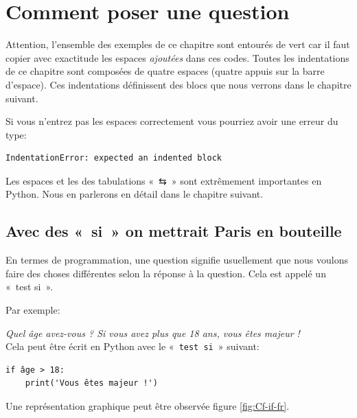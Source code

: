 


\chapter{Comment poser une question\label{chap:question}}

Attention, l'ensemble des exemples de ce chapitre sont entourés de vert car il faut copier avec exactitude les espaces \emph{ajoutées} dans ces codes. Toutes les indentations de ce chapitre sont composées de quatre espaces (quatre appuis sur la barre d'espace). Ces indentations définissent des blocs que nous verrons dans le chapitre suivant.

Si vous n'entrez pas les espaces correctement vous pourriez avoir une erreur du type:

\begin{Verbatim}[frame=single,rulecolor=\color{red}, label=erreur]
IndentationError: expected an indented block
\end{Verbatim}

\setsansfont[Mapping=tex-text]{DejaVu Sans}
Les espaces et les des tabulations «~\textsf{⇆}~» sont extrêmement importantes en Python. Nous en parlerons en détail dans le chapitre suivant.

\section{Avec des «~si~» on mettrait Paris en bouteille}
En termes de programmation, une question signifie usuellement que nous voulons faire des choses différentes selon 
la réponse à la question. Cela est appelé un «~test si~».

Par exemple:

\emph{Quel âge avez-vous ? Si vous avez plus que 18 ans, vous êtes majeur !}\\


Cela peut être écrit en Python avec le «~\texttt{test si}~» suivant:
\begin{Verbatim}[frame=single,rulecolor=\color{gray}, label=ne pas saisir]
if âge > 18:
    print('Vous êtes majeur !')
\end{Verbatim}

Une représentation graphique peut être observée figure \ref{fig:Cf-if-fr}.

